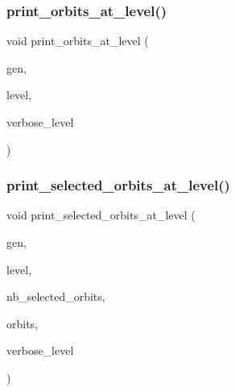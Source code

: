 \subsubsection{\texorpdfstring{print\+\_\+orbits\+\_\+at\+\_\+level()}{print\_orbits\_at\_level()}}
{\footnotesize\ttfamily void print\+\_\+orbits\+\_\+at\+\_\+level (\begin{DoxyParamCaption}\item[{\mbox{\hyperlink{classgenerator}{generator}} $\ast$}]{gen,  }\item[{\mbox{\hyperlink{galois_8h_a09fddde158a3a20bd2dcadb609de11dc}{I\+NT}}}]{level,  }\item[{\mbox{\hyperlink{galois_8h_a09fddde158a3a20bd2dcadb609de11dc}{I\+NT}}}]{verbose\+\_\+level }\end{DoxyParamCaption})}

\mbox{\label{all__cycles_8_c_a9e3a033210b11f8f167631c923ff419a}} 
\subsubsection{\texorpdfstring{print\+\_\+selected\+\_\+orbits\+\_\+at\+\_\+level()}{print\_selected\_orbits\_at\_level()}}
{\footnotesize\ttfamily void print\+\_\+selected\+\_\+orbits\+\_\+at\+\_\+level (\begin{DoxyParamCaption}\item[{\mbox{\hyperlink{classgenerator}{generator}} $\ast$}]{gen,  }\item[{\mbox{\hyperlink{galois_8h_a09fddde158a3a20bd2dcadb609de11dc}{I\+NT}}}]{level,  }\item[{\mbox{\hyperlink{galois_8h_a09fddde158a3a20bd2dcadb609de11dc}{I\+NT}}}]{nb\+\_\+selected\+\_\+orbits,  }\item[{\mbox{\hyperlink{galois_8h_a09fddde158a3a20bd2dcadb609de11dc}{I\+NT}} $\ast$}]{orbits,  }\item[{\mbox{\hyperlink{galois_8h_a09fddde158a3a20bd2dcadb609de11dc}{I\+NT}}}]{verbose\+\_\+level }\end{DoxyParamCaption})}

\mbox{\label{all__cycles_8_c_a0af9145868def351bff5cb923f4d72b4}} 
